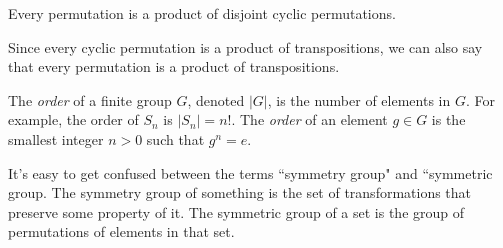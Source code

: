 \documentclass[class=article, crop=false]{standalone}
\begin{document}
\par
\begin{lem}
    Every permutation is a product of disjoint cyclic permutations.
\end{lem}\label{disjointcycleslemma}
\begin{cor}
    Since every cyclic permutation is a product of transpositions, we can also say that every permutation is a product of transpositions.
\end{cor}
\par
The \emph{order} of a finite group $G$, denoted $|G|$, is the number of elements in $G$. For example, the order of $S_n$ is $|S_n|=n!$. The \emph{order} of an element $g \in G$ is the smallest integer $n>0$ such that $g^n=e$.
\begin{note}
    It's easy to get confused between the terms ``symmetry group" and ``symmetric group. The symmetry group of something is the set of transformations that preserve some property of it. The symmetric group of a set is the group of permutations of elements in that set.
\end{note}
\end{document}
